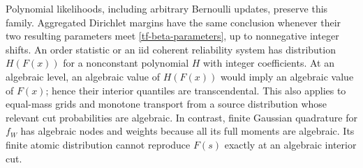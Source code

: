 \documentclass[11pt,a4paper]{article}
\theoremstyle{definition}
\theoremstyle{remark}
\numberwithin{equation}{section}
\begin{document}
Polynomial likelihoods, including arbitrary Bernoulli updates,
preserve this family.  Aggregated Dirichlet margins have the same
conclusion whenever their two resulting parameters meet
\eqref{tf-beta-parameters}, up to nonnegative integer shifts.
An order statistic or an iid coherent reliability system has distribution
$H(F(x))$ for a nonconstant polynomial $H$ with integer coefficients.
At an algebraic level, an algebraic value of $H(F(x))$ would imply an
algebraic value of $F(x)$; hence their interior quantiles are
transcendental.  This also applies to equal-mass grids and monotone
transport from a source distribution whose relevant cut probabilities
are algebraic.  In contrast, finite Gaussian quadrature for $f_W$ has
algebraic nodes and weights because all its full moments are algebraic.
Its finite atomic distribution cannot reproduce $F(s)$ exactly at an
algebraic interior cut.
\end{document}
